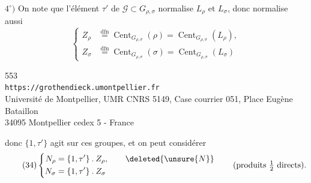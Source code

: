$4^\circ)$ On  note que l'élément $\tau'$ de
 $\mathcal G\subset G_{\rho,\sigma}$
normalise $L_\rho$ et $L_\sigma$, donc normalise aussi
\[
\tag{33}
\left\{\begin{aligned}
Z_\rho&\overset{\mathrm{dfn}}=\operatorname{Cent}_{G_{\rho,\sigma}}(\rho)
=\operatorname{Cent}_{G_{\rho,\sigma}}(L_\rho),\\
Z_\sigma&\overset{\mathrm{dfn}}=\operatorname{Cent}_{G_{\rho,\sigma}}(\sigma)
=\operatorname{Cent}_{G_{\rho,\sigma}}(L_\sigma)
\end{aligned}\right.
\]

{\small
\begin{center}
553\\
\texttt{https://grothendieck.umontpellier.fr}\\
Université de Montpellier, UMR CNRS 5149, Case courrier 051, Place Eugène Bataillon\\
34095 Montpellier cedex 5 - France
\end{center}
}


donc $\{1,\tau'\}$ agit sur ces groupes, et on peut considérer
\[
\tag{34}
\left\{\begin{aligned}
N_\rho&=\{1,\tau'\}\mathbin{.}Z_\rho,\qquad\deleted{\unsure{N}}\\
N_\sigma&=\{1,\tau'\}\mathbin{.}Z_\sigma
\end{aligned}\right.
\qquad(\text{produits }\tfrac12\text{ directs}).
\]

